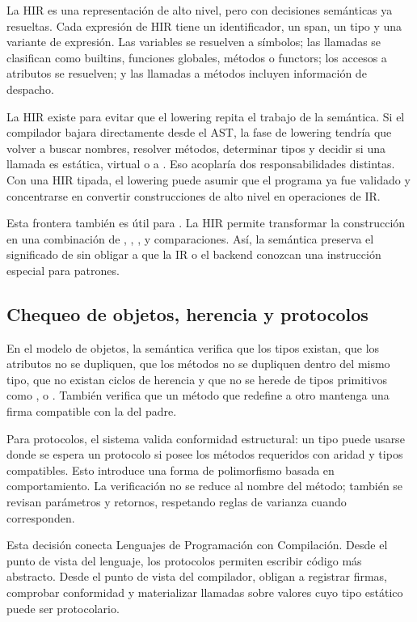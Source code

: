 \documentclass[12pt,letterpaper]{article}
\newcommand{\repo}[1]{\texttt{\detokenize{#1}}}
\begin{document}
La HIR es una representación de alto nivel, pero con decisiones semánticas ya resueltas. Cada expresión de HIR tiene un identificador, un span, un tipo y una variante de expresión. Las variables se resuelven a símbolos; las llamadas se clasifican como builtins, funciones globales, métodos o functors; los accesos a atributos se resuelven; y las llamadas a métodos incluyen información de despacho.

La HIR existe para evitar que el lowering repita el trabajo de la semántica. Si el compilador bajara directamente desde el AST, la fase de lowering tendría que volver a buscar nombres, resolver métodos, determinar tipos y decidir si una llamada es estática, virtual o a \repo{base}. Eso acoplaría dos responsabilidades distintas. Con una HIR tipada, el lowering puede asumir que el programa ya fue validado y concentrarse en convertir construcciones de alto nivel en operaciones de IR.

Esta frontera también es útil para \repo{match}. La HIR permite transformar la construcción en una combinación de \repo{let}, \repo{if}, \repo{is}, \repo{as} y comparaciones. Así, la semántica preserva el significado de \repo{match} sin obligar a que la IR o el backend conozcan una instrucción especial para patrones.

\subsection{Chequeo de objetos, herencia y protocolos}

En el modelo de objetos, la semántica verifica que los tipos existan, que los atributos no se dupliquen, que los métodos no se dupliquen dentro del mismo tipo, que no existan ciclos de herencia y que no se herede de tipos primitivos como \repo{Number}, \repo{String} o \repo{Boolean}. También verifica que un método que redefine a otro mantenga una firma compatible con la del padre.

Para protocolos, el sistema valida conformidad estructural: un tipo puede usarse donde se espera un protocolo si posee los métodos requeridos con aridad y tipos compatibles. Esto introduce una forma de polimorfismo basada en comportamiento. La verificación no se reduce al nombre del método; también se revisan parámetros y retornos, respetando reglas de varianza cuando corresponden.

Esta decisión conecta Lenguajes de Programación con Compilación. Desde el punto de vista del lenguaje, los protocolos permiten escribir código más abstracto. Desde el punto de vista del compilador, obligan a registrar firmas, comprobar conformidad y materializar llamadas sobre valores cuyo tipo estático puede ser protocolario.
\end{document}
